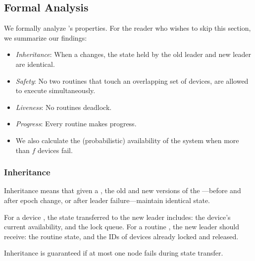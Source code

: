 \subsection{Formal Analysis}
\label{comesh:sec:analysis}

We formally analyze \sysname{}'s properties.
For the reader who wishes to skip this section, we  summarize  our findings:

\begin{itemize}
\item {\it Inheritance}: When a \kgroup{} %
changes, the state held by the old leader and new leader are identical.
\item {\it Safety}: No two routines that touch an overlapping set of devices, are allowed to execute simultaneously. 
\item {\it Liveness}: No routines deadlock.
\item {\it Progress}: Every routine makes progress.
\item We also calculate the (probabilistic) availability of the system when more than $f$ devices fail. 
\end{itemize}

\subsubsection{Inheritance}

\begin{definition}
Inheritance means that given a \kgroup{}, the old and new versions of the \kgroup{}---before and after epoch change, or after leader failure---maintain identical state. 
\end{definition}

For a device \kgroup{}, the state transferred to the new leader includes:
the device's current availability, and the lock queue. 
For a routine \kgroup{}, the new leader should receive: 
the routine state, and the IDs of devices already locked and released. 

\begin{lemma}
\label{comesh:lemma:inheritance}
Inheritance is guaranteed if at most one node fails during state transfer.
\end{lemma}

